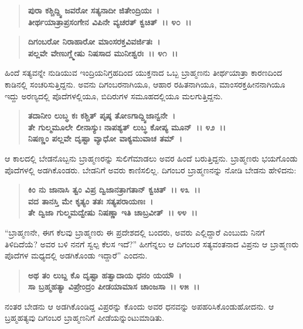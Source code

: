 \begin{verse}
\textbf{ಪುರಾ ಕಶ್ಚಿದ್ದ್ವಿ ಜವರೋ ಸತ್ಯನಾದೀ ಜಿತೇಂದ್ರಿಯಃ~।}\\\textbf{ತೀರ್ಥಯಾತ್ರಾಪ್ರಸಂಗೇನ ವಿಪಿನೇ ವ್ಯಚರತ್ ಕ್ವಚಿತ್~।। ೪೦~।। }
\end{verse}

\begin{verse}
\textbf{ದಿಗಂಬರೋ ನಿರಾಹಾರೋ ಮಾಂಸರಕ್ತವಿವರ್ಜಿತಃ~।}\\\textbf{ಪಲ್ಲವೇ ವೇಣುಗ್ಲ್ಮೇಷು ನಿಷಸಾದ ಮುನೀಶ್ವರಃ~।। ೪೧~।।}
\end{verse}

ಹಿಂದೆ ಸತ್ಯವನ್ನೇ ನುಡಿಯುವ ಇಂದ್ರಿಯನಿಗ್ರಹದಿಂದ ಯುಕ್ತನಾದ ಒಬ್ಬ ಬ್ರಾಹ್ಮಣನು ತೀರ್ಥಯಾತ್ರಾ ಕಾರಣದಿಂದ ಕಾಡಿನಲ್ಲಿ ಸಂಚರಿಸುತ್ತಿದ್ದನು. ಅವನು ದಿಗಂಬರನಾಗಿಯೂ, ಆಹಾರ ರಹಿತನಾಗಿಯೂ, ಮಾಂಸರಕ್ತಹೀನನಾಗಿಯೂ ಇದ್ದು ಅರಣ್ಯದಲ್ಲಿ ಪೊದೆಗಳಲ್ಲಿಯೂ, ಬಿದಿರುಗಳ ಸಮೂಹದಲ್ಲಿಯೂ ಮಲಗುತ್ತಿದ್ದನು.

\begin{verse}
\textbf{ತದಾನೀಂ ಲುಬ್ಧ ಕಃ ಕಶ್ಚಿತ್ ಪೃಷ್ಠ ತೋಽಗಾದ್ದ್ವಿಜಾನ್ವನೇ~।}\\\textbf{ತೇ ಗುಲ್ಮಮೂಲೇ ಲೀನಾಸ್ಯುಃ ನಾಪಶ್ಯತ್ ಲುಬ್ಧ ಕೋಪ್ಯ ಮೂನ್~।। ೪೨~।।}\\\textbf{ನಿಷಣ್ಣಂ ಪಲ್ಲವೇ ದೃಷ್ಟಾ ವ್ಯಾಧೋ ವಾಕ್ಯಮುವಾಚ ತಮ್~।}
\end{verse}

ಆ ಕಾಲದಲ್ಲಿ ಬೇಡನೊಬ್ಬನು ಬ್ರಾಹ್ಮಣರನ್ನು ಸುಲಿಗೆಮಾಡಲು ಅವರ ಹಿಂದೆ ಬರುತ್ತಿದ್ದನು. ಬ್ರಾಹ್ಮಣರು ಭಯಗೊಂಡು ಪೊದೆಗಳಲ್ಲಿ ಅಡಗಿಕೊಂಡರು. ಬೇಡನಿಗೆ ಅವರು ಕಾಣಿಸಲಿಲ್ಲ. ದಿಗಂಬರ ಬ್ರಾಹ್ಮಣನನ್ನು ನೋಡಿ ಬೇಡನು ಹೇಳಿದನು:

\begin{verse}
\textbf{ಕಿಂ ನು ಜಾನಾಸಿ ತ್ವಂ ವಿಪ್ರ ದ್ವಿಜಾನತ್ರಾಗತಾನ್ ಕ್ವಚಿತ್~।। ೪೩~।।}\\\textbf{ವದ ತಾನಸ್ತಿ ಮೇ ಕೃತ್ಯಂ ತತಃ ಸತ್ಯಪರಾಯಣಃ~। }\\\textbf{ತೇ ದ್ವಿಜಾ ಗುಲ್ಮಮದ್ವೇಷು ನಿಷಣ್ಣಾ ಇತಿ ಚಾಬ್ರವೀತ್~।। ೪೪~।।}
\end{verse}

“ಬ್ರಾಹ್ಮಣನೇ, ಈಗ ಕೆಲವು ಬ್ರಾಹ್ಮಣರು ಈ ಪ್ರದೇಶದಲ್ಲಿ ಬಂದರು, ಅವರು ಎಲ್ಲಿದ್ದಾರೆ ಎಂಬುದು ನಿನಗೆ ತಿಳಿದಿದೆಯೆ? ಅವರ ಬಳಿ ನನಗೆ ಸ್ವಲ್ಪ ಕೆಲಸ ಇದೆ?” ಹೀಗೆನ್ನಲು ಆ ದಿಗಂಬರ ಸತ್ಯವಂತನಾದ ವಿಪ್ರನು ಆ ಬ್ರಾಹ್ಮಣರು ಪೊದೆಗಳ ಮಧ್ಯದಲ್ಲಿ ಅಡಗಿಕೊಂಡು ಇದ್ದಾರೆ” ಎಂದನು.

\begin{verse}
\textbf{ಅಥ ತಂ ಲುಬ್ದ ಕೊ ದೃಷ್ಟಾ ಹತ್ವಾದಾಯ ಧನಂ ಯಯೌ~।}\\\textbf{ಸಾ ಬ್ರಹ್ಮಹತ್ಯಾ ವಿಪ್ರೇಂದ್ರಂ ಪೀಡಯಾಮಾಸ ಚಾಂಜಸಾ~।। ೪೫~।।}
\end{verse}

ನಂತರ ಬೇಡನು ಆ ಅಡಗಿಕೊಂಡಿದ್ದ ವಿಪ್ರರನ್ನು ಕೊಂದು ಅವರ ಧನವನ್ನು ಅಪಹರಿಸಿಕೊಂಡುಹೋದನು. ಆ ಬ್ರಹ್ಮಹತ್ಯವು ದಿಗಂಬರ ಬ್ರಾಹ್ಮಣನಿಗೆ ಪೀಡೆಯನ್ನುಂಟುಮಾಡಿತು.

